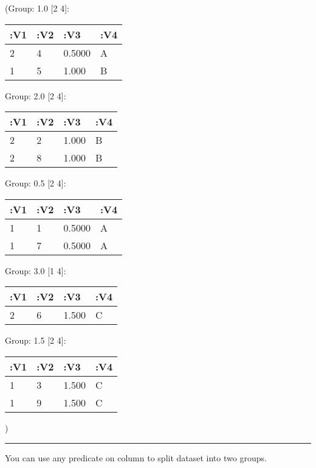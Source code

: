 \documentclass[]{article}
\newenvironment{Shaded}{\begin{snugshade}}{\end{snugshade}}
\newcommand{\KeywordTok}[1]{\textcolor[rgb]{0.13,0.29,0.53}{\textbf{#1}}}
\newcommand{\FloatTok}[1]{\textcolor[rgb]{0.00,0.00,0.81}{#1}}
\newcommand{\VariableTok}[1]{\textcolor[rgb]{0.00,0.00,0.00}{#1}}
\newcommand{\AttributeTok}[1]{\textcolor[rgb]{0.77,0.63,0.00}{#1}}
\newcommand{\NormalTok}[1]{#1}
\begin{document}
(Group: 1.0 {[}2 4{]}:

\begin{longtable}[]{@{}llll@{}}
\toprule
:V1 & :V2 & :V3 & :V4\tabularnewline
\midrule
\endhead
2 & 4 & 0.5000 & A\tabularnewline
1 & 5 & 1.000 & B\tabularnewline
\bottomrule
\end{longtable}

Group: 2.0 {[}2 4{]}:

\begin{longtable}[]{@{}llll@{}}
\toprule
:V1 & :V2 & :V3 & :V4\tabularnewline
\midrule
\endhead
2 & 2 & 1.000 & B\tabularnewline
2 & 8 & 1.000 & B\tabularnewline
\bottomrule
\end{longtable}

Group: 0.5 {[}2 4{]}:

\begin{longtable}[]{@{}llll@{}}
\toprule
:V1 & :V2 & :V3 & :V4\tabularnewline
\midrule
\endhead
1 & 1 & 0.5000 & A\tabularnewline
1 & 7 & 0.5000 & A\tabularnewline
\bottomrule
\end{longtable}

Group: 3.0 {[}1 4{]}:

\begin{longtable}[]{@{}llll@{}}
\toprule
:V1 & :V2 & :V3 & :V4\tabularnewline
\midrule
\endhead
2 & 6 & 1.500 & C\tabularnewline
\bottomrule
\end{longtable}

Group: 1.5 {[}2 4{]}:

\begin{longtable}[]{@{}llll@{}}
\toprule
:V1 & :V2 & :V3 & :V4\tabularnewline
\midrule
\endhead
1 & 3 & 1.500 & C\tabularnewline
1 & 9 & 1.500 & C\tabularnewline
\bottomrule
\end{longtable}

)

\begin{center}\rule{0.5\linewidth}{0.5pt}\end{center}

You can use any predicate on column to split dataset into two groups.

\begin{Shaded}
\end{Shaded}
\end{document}
